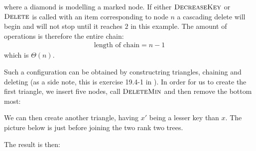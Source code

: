 \documentclass[oneside,11pt,openright]{report}
\newcommand{\BigT}[1]{\ensuremath{\Theta\left(#1\right)}}
\newcommand{\DeleteMin}{\textsc{DeleteMin}}
\newcommand{\DecreaseKey}{\textsc{DecreaseKey}}
\newcommand{\Delete}{\textsc{Delete}}
\begin{document}
where a diamond is modelling a marked node. If either $\DecreaseKey$ or $\Delete$ is called with an item corresponding to node $n$ a cascading delete will begin and will not stop until it reaches $2$ in this example. The amount of operations is therefore the entire chain:
\begin{align*}
  \text{length of chain} = n - 1
\end{align*}
which is $\BigT{n}$.

Such a configuration can be obtained by constructring triangles, chaining and deleting (as a side note, this is exercise 19.4-1 in \cite{ITA09}). In order for us to create the first triangle, we insert five nodes, call $\DeleteMin$ and then remove the bottom most:

\begin{center}
\end{center}

We can then create another triangle, having $x'$ being a lesser key than $x$. The picture below is just before joining the two rank two trees.

\begin{center}
\end{center}

The result is then: 

\begin{center}
\end{center}
\end{document}
